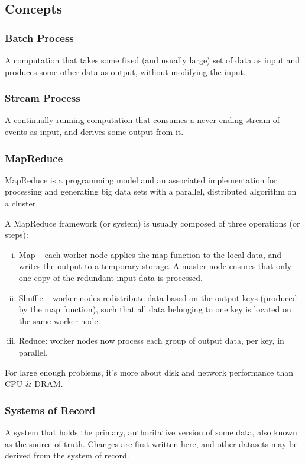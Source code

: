 \documentclass{article}
\begin{document}
    \subsection{Concepts}
    
    \subsubsection{Batch Process}
    A computation that takes some fixed (and usually large) set of data as input and produces some other data as output, without modifying the input.
    
    \subsubsection{Stream Process}
    A continually running computation that consumes a never-ending stream of events as input, and derives some output from it.
    
    \subsubsection{MapReduce}
    MapReduce is a programming model and an associated implementation for processing and generating big data sets with a parallel, distributed algorithm on a cluster.
    
    A MapReduce framework (or system) is usually composed of three operations (or steps):
    \begin{enumerate}[i.]
        \item Map -- each worker node applies the map function to the local data, and writes the output to a temporary storage. A master node ensures that only one copy of the redundant input data is processed.
        \item Shuffle -- worker nodes redistribute data based on the output keys (produced by the map function), such that all data belonging to one key is located on the same worker node.
        \item Reduce: worker nodes now process each group of output data, per key, in parallel.
    \end{enumerate}
    
    For large enough problems, it’s more about disk and network performance than CPU \& DRAM.
    
    \subsubsection{Systems of Record}
    A system that holds the primary, authoritative version of some data, also known as  the source of truth. Changes are first written here, and other datasets may be derived from the system of record.
    
\end{document}
